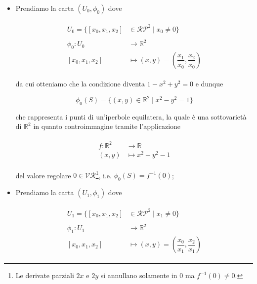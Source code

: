 \begin{itemize}
	\item Prendiamo la carta $ (U_{0},\phi_{0}) $ dove
	
	\begin{align}
		\begin{split}
			U_{0} = \{ [x_{0},x_{1},x_{2}] &\in \mathcal{RP}^{2} \mid x_{0} \neq 0 \}\\\\
			\phi_{0} : U_{0} &\to \mathbb{R}^{2}\\
			[x_{0},x_{1},x_{2}] &\mapsto (x,y) = \left( \dfrac{x_{1}}{x_{0}}, \dfrac{x_{2}}{x_{0}} \right)
		\end{split}
	\end{align}
	
	da cui otteniamo che la condizione diventa $ 1 - x^{2} + y^{2} = 0 $ e dunque
	
	\begin{equation}
		\phi_{0}(S) = \{ (x,y) \in \mathbb{R}^{2} \mid x^{2} - y^{2} = 1 \}
	\end{equation}

	che rappresenta i punti di un'iperbole equilatera, la quale è una sottovarietà di $ \mathbb{R}^{2} $ in quanto controimmagine tramite l'applicazione
	
	\begin{align}
		\begin{split}
			f : \mathbb{R}^{2} &\to \mathbb{R}\\
			(x,y) &\mapsto x^{2} - y^{2} - 1
		\end{split}
	\end{align}

	del valore regolare $ 0 \in \mathcal{VR} $\footnote{%
		Le derivate parziali $ 2x $ e $ 2y $ si annullano solamente in 0 ma $ f^{-1}(0) \neq 0 $.%
	}, i.e. $ \phi_{0}(S) = f^{-1}(0) $;
	
	\item Prendiamo la carta $ (U_{1},\phi_{1}) $ dove
	
	\begin{align}
		\begin{split}
			U_{1} = \{ [x_{0},x_{1},x_{2}] &\in \mathcal{RP}^{2} \mid x_{1} \neq 0 \}\\\\
			\phi_{1} : U_{1} &\to \mathbb{R}^{2}\\
			[x_{0},x_{1},x_{2}] &\mapsto (x,y) = \left( \dfrac{x_{0}}{x_{1}}, \dfrac{x_{2}}{x_{1}} \right)
		\end{split}
	\end{align}
	

\end{itemize}
